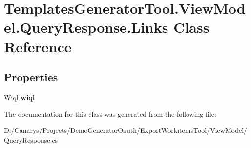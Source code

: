 \hypertarget{class_templates_generator_tool_1_1_view_model_1_1_query_response_1_1_links}{}\section{Templates\+Generator\+Tool.\+View\+Model.\+Query\+Response.\+Links Class Reference}
\label{class_templates_generator_tool_1_1_view_model_1_1_query_response_1_1_links}
\subsection*{Properties}
\begin{DoxyCompactItemize}
\item 
\mbox{\label{class_templates_generator_tool_1_1_view_model_1_1_query_response_1_1_links_a3a742f30401b2ba6610a09a2f2a257de}} 
\mbox{\hyperlink{class_templates_generator_tool_1_1_view_model_1_1_query_response_1_1_wiql}{Wiql}} {\bfseries wiql}
\end{DoxyCompactItemize}


The documentation for this class was generated from the following file\+:\begin{DoxyCompactItemize}
\item 
D\+:/\+Canarys/\+Projects/\+Demo\+Generator\+Oauth/\+Export\+Workitems\+Tool/\+View\+Model/Query\+Response.\+cs\end{DoxyCompactItemize}
